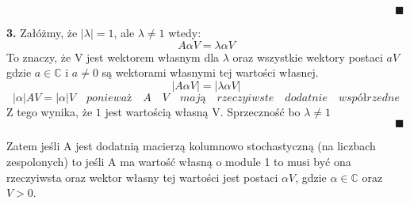 \documentclass[a4paper]{article}
\newcommand*{\field}[1]{\mathbb{#1}}
\begin{document}
\begin{adjustwidth}{30pt}{30pt}
$\hspace{420pt}\blacksquare$

\textbf{3.} Załóżmy, że $|\lambda| = 1$, ale $\lambda \neq 1$ wtedy:
$$A\alpha V = \lambda \alpha V$$
To znaczy, że V jest wektorem własnym dla $\lambda$ oraz wszystkie wektory postaci $aV$ gdzie $a \in \field{C}$ i $a \neq 0$ są wektorami własnymi tej wartości własnej.
$$|A\alpha V| = |\lambda \alpha V|$$
$$|\alpha|AV = |\alpha| V \quad ponieważ \quad A \quad V \quad mają \quad rzeczyiwste \quad dodatnie \quad współrzedne$$
Z tego wynika, że $1$ jest wartością własną V. Sprzeczność bo $\lambda \neq 1$\\

$\hspace{420pt}\blacksquare$
\end{adjustwidth}
Zatem jeśli A jest dodatnią macierzą kolumnowo stochastyczną (na liczbach zespolonych) to jeśli A ma wartość własną o module 1 to musi być ona rzeczyiwsta oraz wektor własny tej wartości jest postaci $\alpha V$, gdzie $\alpha \in \field{C}$ oraz $V > 0$. 
\end{document}

